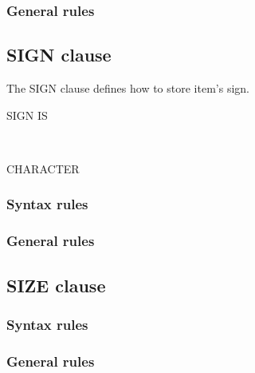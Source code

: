 \subsubsection{General rules}

\subsection{SIGN clause}

The SIGN clause defines how to store item's sign.

\begin{syntax}
  SIGN IS
  \begin{1=}
     \\
  \end{1=}
  \begin{0-1}
     CHARACTER
  \end{0-1}
\end{syntax}

\subsubsection{Syntax rules}

\subsubsection{General rules}

\subsection{SIZE clause}

\begin{syntax}[\miscextcolour]
\end{syntax}

\subsubsection{Syntax rules}

\subsubsection{General rules}

